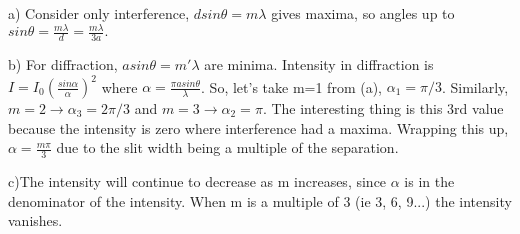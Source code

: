 \documentclass[10pt]{article}
\newenvironment{problem}[2][Problem]{\begin{trivlist}
\item[\hskip \labelsep {\bfseries #1}\hskip \labelsep {\bfseries #2.}]}{\end{trivlist}}
\begin{document}
\begin{problem}{5}
\item a) Consider only interference, $dsin\theta=m\lambda$ gives maxima, so angles up to $sin\theta=\frac{m\lambda}{d}=\frac{m\lambda}{3a}.$
\item b) For diffraction, $asin\theta=m'\lambda$ are minima. Intensity in diffraction is $I=I_0\left( \frac{sin\alpha}{\alpha}\right)^2$ where $\alpha=\frac{\pi a sin\theta}{\lambda}$. So, let's take m=1 from (a), $\alpha_1=\pi/3$. Similarly, $m=2 \xrightarrow{}\alpha_3=2\pi/3$ and $m=3\xrightarrow{}\alpha_2=\pi$. The interesting thing is this 3rd value because the intensity is zero where interference had a maxima. Wrapping this up, $\alpha=\frac{m\pi }{3}$ due to the slit width being a multiple of the separation. 
\item c)The intensity will continue to decrease as m increases, since $\alpha$ is in the denominator of the intensity. When m is a multiple of 3 (ie 3, 6, 9...) the intensity vanishes.

\end{problem}




\end{document}
